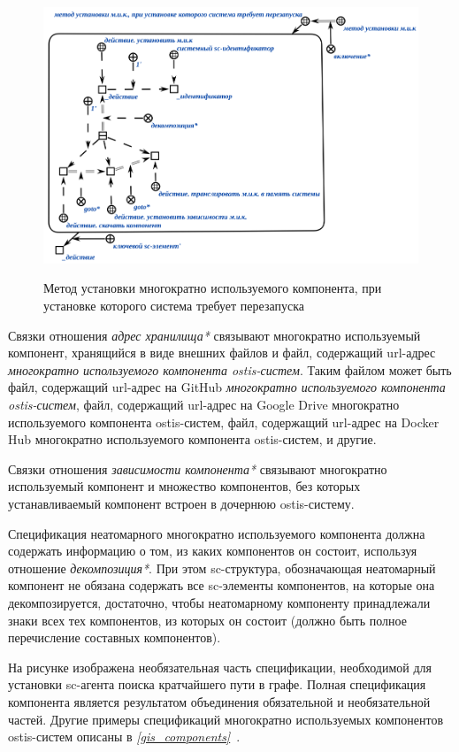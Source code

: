 \begin{figure}[H]
	\caption{Метод установки многократно используемого компонента, при установке которого система требует перезапуска}
	\includegraphics[scale=0.6]{author/part5/figures/install_with_reboot_method.png}
	\label{fig:install_with_reboot_method}
\end{figure}


Связки отношения \textit{адрес хранилища*} связывают многократно используемый компонент, хранящийся в виде внешних файлов и файл, содержащий url-адрес \textit{многократно используемого компонента ostis-систем}. Таким файлом может быть файл, содержащий url-адрес на GitHub \textit{многократно используемого компонента ostis-систем}, файл, содержащий url-адрес на Google Drive многократно используемого компонента ostis-систем, файл, содержащий url-адрес на Docker Hub многократно используемого компонента ostis-систем, и другие.

Связки отношения \textit{зависимости компонента*} связывают многократно используемый компонент и множество компонентов, без которых устанавливаемый компонент  встроен в дочернюю ostis-систему.

Спецификация неатомарного многократно используемого компонента должна содержать информацию о том, из каких компонентов он состоит, используя отношение \textit{декомпозиция*}. При этом sc-структура, обозначающая неатомарный компонент не обязана содержать все sc-элементы компонентов, на которые она декомпозируется, достаточно, чтобы неатомарному компоненту принадлежали знаки всех тех компонентов, из которых он состоит (должно быть полное перечисление составных компонентов).

На рисунке \textit{} изображена необязательная часть спецификации, необходимой для установки sc-агента поиска кратчайшего пути в графе. Полная спецификация компонента является результатом объединения обязательной и необязательной частей. Другие примеры спецификаций многократно используемых компонентов ostis-систем описаны в \textit{\ref{gis_components}~}.

